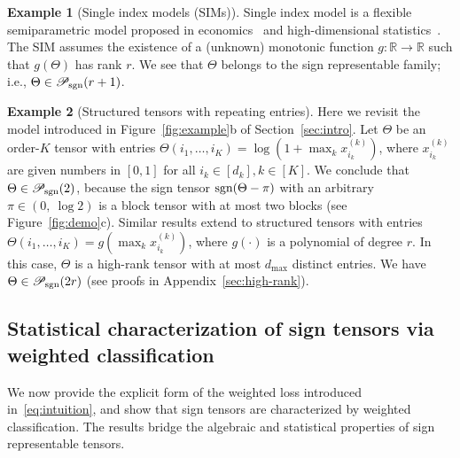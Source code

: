 \documentclass{article}
\theoremstyle{plain}
\theoremstyle{definition}
\newtheorem{example}{Example}
\def\sign{\textup{sgn}}
\def\caliP{\mathscr{P}_{\textup{sgn}}}
\begin{document}
\begin{example}[Single index models (SIMs)] Single index model is a flexible semiparametric model proposed in economics~\citep{robinson1988root} and high-dimensional statistics~\citep{balabdaoui2019least,ganti2017learning}. The SIM assumes the existence of a (unknown) monotonic function $g\colon \mathbb{R}\to \mathbb{R}$ such that $g(\Theta)$ has rank $r$. We see that $\Theta$ belongs to the sign representable family; i.e., $\Theta\in \caliP(r+1)$. 
\end{example}
\vspace{.05cm}

\begin{example}[Structured tensors with repeating entries]\label{eq:example} Here we revisit the model introduced in Figure~\ref{fig:example}b of Section~\ref{sec:intro}. Let $\Theta$ be an order-$K$ tensor with entries $\Theta(i_1,\ldots,i_K)=\log(1+\max_kx^{(k)}_{i_k})$, where $x^{(k)}_{i_k}$ are given numbers in $[0,1]$ for all $i_k\in[d_k], k\in[K]$. We conclude that $\Theta \in \caliP(2)$, because the sign tensor $\sign(\Theta-\pi)$ with an arbitrary $\pi\in(0,\ \log 2)$ is a block tensor with at most two blocks (see Figure~\ref{fig:demo}c). Similar results extend to structured tensors with entries $\Theta(i_1,\ldots,i_K)=g(\max_kx^{(k)}_{i_k})$, where $g(\cdot)$ is a polynomial of degree $r$. In this case, $\Theta$ is a high-rank tensor with at most $d_{\max}$ distinct entries. We have $\Theta\in \caliP(2r)$ (see proofs in Appendix~\ref{sec:high-rank}). 
\end{example}


\subsection{Statistical characterization of sign tensors via weighted classification}\label{sec:identifiability}
We now provide the explicit form of the weighted loss introduced in~\eqref{eq:intuition}, and show that sign tensors are characterized by weighted classification. The results bridge the algebraic and statistical properties of sign representable tensors.
 
\end{document}
